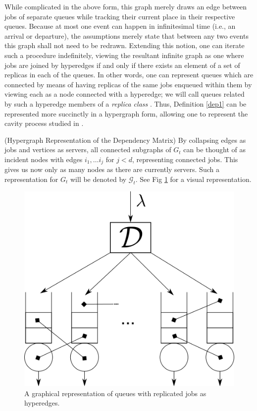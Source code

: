While complicated in the above form, this graph merely draws an edge between jobs of separate queues while tracking their current place in their respective queues. Because at most one event can happen in infinitesimal time (i.e., an arrival or departure), the assumptions merely state that between any two events this graph shall not need to be redrawn. Extending this notion, one can iterate such a procedure indefinitely, viewing the resultant infinite graph as one where jobs are joined by hyperedges if and only if there exists an element of a set of replicas in each of the queues. In other words, one can represent queues which are connected by means of having replicas of the same jobs enqueued within them by viewing each as a node connected with a hyperedge; we will call queues related by such a hyperedge members of a \textit{replica class} . Thus, Definition \ref{dep1} can be represented more succinctly in a hypergraph form, allowing one to represent the cavity process studied in \cite{Hellemans}.

\begin{definition}(Hypergraph Representation of the Dependency Matrix)
    By collapsing edges as jobs and vertices as servers, all connected subgraphs of $G_{t}$ can be thought of as incident nodes with edges $i_{1}, \dots i_{j}$ for $j<d$, representing connected jobs. This gives us now only as many nodes as there are currently servers. Such a representation for $G_{t}$ will be denoted by $\mathcal{G}_{t}$. See Fig \ref{fig:hyper} for a visual representation.
\end{definition}

\begin{figure}
    \centering
    \includegraphics[scale=0.5]{systemredun}
    \caption{A graphical representation of queues with replicated jobs as hyperedges.}
    \label{fig:hyper}
\end{figure}

